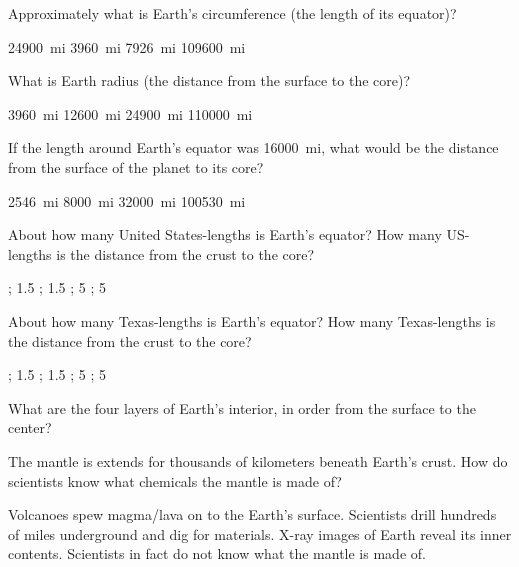 \documentclass{exam}
\begin{document}
\begin{questions}

\question
Approximately what is Earth's circumference (the length of its equator)?

\begin{randomizechoices}
    \correctchoice \SI{24900}{mi}
    \choice \SI{3960}{mi}
    \choice \SI{7926}{mi}
    \choice \SI{109600}{mi}
\end{randomizechoices}

\question
What is Earth radius (the distance from the surface to the core)?

\begin{randomizechoices}
    \correctchoice \SI{3960}{mi}
    \choice \SI{12600}{mi}
    \choice \SI{24900}{mi}
    \choice \SI{110000}{mi}
\end{randomizechoices}

\question
If the length around Earth's equator was \SI{16000}{mi}, what would be the distance from the surface of the planet to its core?

\begin{randomizechoices}
    \correctchoice \SI{2546}{mi}
    \choice \SI{8000}{mi}
    \choice \SI{32000}{mi}
    \choice \SI{100530}{mi}
\end{randomizechoices}

\question
About how many United States-lengths is Earth's equator? How many US-lengths is the distance from the crust to the core?
\begin{randomizechoices}
    ; 1.5
    ; 1.5
    ; 5
    ; 5
\end{randomizechoices}

\question
About how many Texas-lengths is Earth's equator? How many Texas-lengths is the distance from the crust to the core?

\begin{randomizechoices}
    ; 1.5
    ; 1.5
    ; 5
    ; 5
\end{randomizechoices}

\question
What are the four layers of Earth's interior, in order from the surface to the center?

\question
The mantle is extends for thousands of kilometers beneath Earth's crust. How do scientists know what chemicals the mantle is made of?

\begin{randomizechoices}
    \correctchoice Volcanoes spew magma/lava on to the Earth's surface.
    \choice Scientists drill hundreds of miles underground and dig for materials.
    \choice X-ray images of Earth reveal its inner contents.
    \choice Scientists in fact do not know what the mantle is made of.
\end{randomizechoices}


\end{questions}
\end{document}
